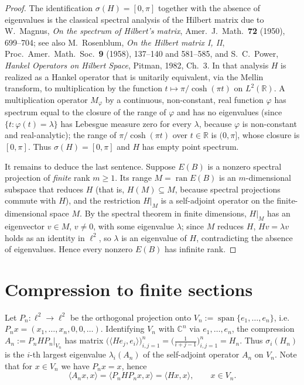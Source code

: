 \documentclass[12pt]{article}
\theoremstyle{remark}
\DeclareMathOperator{\ran}{ran}
\newcommand{\spec}{\sigma}
\begin{document}
\begin{proof}
The identification $\spec(H)=[0,\pi]$ together with the absence of eigenvalues is the classical
spectral analysis of the Hilbert matrix due to W.~Magnus, \emph{On the spectrum of Hilbert's
matrix}, Amer.\ J.\ Math.\ \textbf{72} (1950), 699--704; see also M.~Rosenblum, \emph{On the
Hilbert matrix I, II}, Proc.\ Amer.\ Math.\ Soc.\ \textbf{9} (1958), 137--140 and 581--585, and
S.~C.~Power, \emph{Hankel Operators on Hilbert Space}, Pitman, 1982, Ch.~3. In that analysis $H$
is realized as a Hankel operator that is unitarily equivalent, via the Mellin transform, to
multiplication by the function $t\mapsto \pi/\cosh(\pi t)$ on $L^2(\mathbb{R})$. A multiplication
operator $M_\varphi$ by a continuous, non-constant, real function $\varphi$ has spectrum equal to
the closure of the range of $\varphi$ and has no eigenvalues (since $\{t:\varphi(t)=\lambda\}$ has
Lebesgue measure zero for every $\lambda$, because $\varphi$ is non-constant and real-analytic);
the range of $\pi/\cosh(\pi t)$ over $t\in\mathbb{R}$ is $(0,\pi]$, whose closure is $[0,\pi]$.
Thus $\spec(H)=[0,\pi]$ and $H$ has empty point spectrum.

It remains to deduce the last sentence. Suppose $E(B)$ is a nonzero spectral projection of
\emph{finite} rank $m\ge1$. Its range $M=\ran E(B)$ is an $m$-dimensional subspace that reduces
$H$ (that is, $H(M)\subseteq M$, because spectral projections commute with $H$), and the
restriction $H|_M$ is a self-adjoint operator on the finite-dimensional space $M$. By the
spectral theorem in finite dimensions, $H|_M$ has an eigenvector $v\in M$, $v\ne0$, with some
eigenvalue $\lambda$; since $M$ reduces $H$, $Hv=\lambda v$ holds as an identity in $\ell^2$, so
$\lambda$ is an eigenvalue of $H$, contradicting the absence of eigenvalues. Hence every nonzero
$E(B)$ has infinite rank.
\end{proof}

\section{Compression to finite sections}

Let $P_n\colon\ell^2\to\ell^2$ be the orthogonal projection onto
$V_n:=\operatorname{span}\{e_1,\dots,e_n\}$, i.e.\ $P_nx=(x_1,\dots,x_n,0,0,\dots)$. Identifying
$V_n$ with $\mathbb{C}^n$ via $e_1,\dots,e_n$, the compression $A_n:=P_nHP_n|_{V_n}$ has matrix
$\bigl(\langle He_j,e_i\rangle\bigr)_{i,j=1}^n=\bigl(\tfrac1{i+j-1}\bigr)_{i,j=1}^n=H_n$. Thus
$\sigma_i(H_n)$ is the $i$-th largest eigenvalue $\lambda_i(A_n)$ of the self-adjoint operator
$A_n$ on $V_n$. Note that for $x\in V_n$ we have $P_nx=x$, hence
\begin{equation}\label{eq:rayleigh}
\langle A_n x,x\rangle=\langle P_nHP_n x,x\rangle=\langle Hx,x\rangle ,\qquad x\in V_n .
\end{equation}
\end{document}

